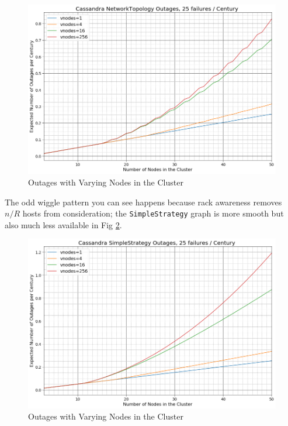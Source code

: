 \documentclass{article}
\begin{document}
\begin{figure}[H]
    \centering
    \includegraphics[width=1.0\textwidth]{images/outages_nodes_small.png}
    \caption{Outages with Varying Nodes in the Cluster}
    \label{fig:outages_nodes_small}
\end{figure}

The odd wiggle pattern you can see happens because rack awareness removes $n/R$
hosts from consideration; the \texttt{SimpleStrategy} graph is more smooth but also
much less available in Fig \ref{fig:outages_nodes_small_simple}.

\begin{figure}[H]
    \centering
    \includegraphics[width=1.0\textwidth]{images/outages_nodes_small_simple.png}
    \caption{Outages with Varying Nodes in the Cluster}
    \label{fig:outages_nodes_small_simple}
\end{figure}
\end{document}
